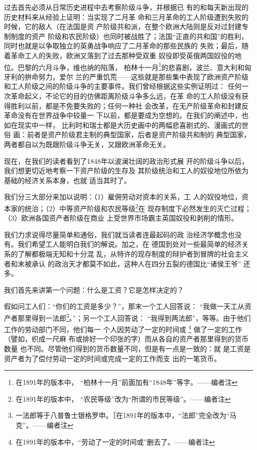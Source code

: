 \documentclass[a4paper,twoside,12pt,AutoFakeBold]{ctexart}
\begin{document}
过去首先必须从日常历史进程中去考察阶级斗争，并根据已
有的和每天新出现的历史材料来从经验上证明：当实现了二月革
命和三月革命的工人阶级遭到失败的时候，它的敌人（在法国是资
产阶级共和派，在整个欧洲大陆则是反对过封建专制制度的资产
阶级和农民阶级）也同时被战胜了；法国“正直的共和国”的胜利，
同时也就是以争取独立的英勇战争响应了二月革命的那些民族的
失败；最后，随着革命工人的失败，欧洲又落到了过去那种受双重
奴役即受英俄两国奴役的地位。巴黎的六月斗争，维也纳的陷落，
柏林十一月\footnote{在1891年的版本中， “柏林十一月”前面加有“1848年”等字。——编者注}的悲喜剧，波兰、意大利和匈牙利的拚命努力，爱尔
兰的严重饥荒——这些就是那些集中表现了欧洲资产阶级和工人阶级之间的阶级斗争的主要事件。我们曾经根据这些实例证明过：
任何一次革命起义，不论它的目的仿佛距离阶级斗争多么远，在革
命的工人阶级没有获得胜利以前，都是不免要失败的；任何一种社
会改革，在无产阶级革命和封建反革命没有在世界战争中较量一
下以前，都是要成为空想的。在我们的阐述中，也如在现实中一样，
比利时和瑞士都是大历史画中的两幅悲喜剧式的、漫画式的世俗
画：前者是资产阶级君主制的典型国家，后者是资产阶级共和制的
典型国家，两者都自以为既跟阶级斗争无关，又跟欧洲革命无关。

现在，在我们的读者看到了1848年以波澜壮阔的政治形式展
开的阶级斗争以后，我们想更切近地考察一下资产阶级的生存及
其阶级统治和工人的奴役地位所依为基础的经济关系本身，也就
适当其时了。

我们分三大部分来加以说明：（1）雇佣劳动对资本的关系，工
人的奴役地位，资本家的统治；（2）中等资产阶级和农民等级\footnote{在1891年的版本中， “农民等级”改为“所谓的市民等级”。——编者注}在
现存制度下必然发生的灭亡过程；（3）欧洲各国资产者阶级在商业
上受世界市场霸主英国奴役和剥削的情形。

我们力求说得尽量简单和通俗，我们就当读者连最起码的政
治经济学概念也没有。我们希望工人能明白我们的解说。加之，在
德国到处对一些最简单的经济关系的了解都极端无知和十分混
乱，从特许的现存制度的辩护者到冒牌的社会主义者和末被承认
的政治天才都莫不如此，这种人在四分五裂的德国比“诸侯王爷”
还多。

我们首先来讲第一个问题：什么是工资？它是怎样决定的？

假如问工人们：“你们的工资是多少？”，那末一个工人回答说：
“我做一天工从资产者那里得到一法郎\footnote{一法郎等于八普鲁士银格罗申。［在1891年的版本中，“法郎”完全改为“马克”。——编者注}。”；另一个工人回答说：
“我得到两法郎”，等等。由于他们工作的劳动部门不同，他们每一
个人因劳动了一定的时间或 \footnote{在1891年的版本中，“劳动了一定的时间或”删去了。——编者注} 做了一定的工作（譬如，织成一尺麻
布或排好一个印张的字）而从各自的资产者那里得到的货币数量
也不同。尽管他们得到的货币数量不同，但是有一点是一致的：就
是工资是资产者为了偿付劳动一定的时间或完成一定的工作而支
出的一笔货币。
\end{document}
